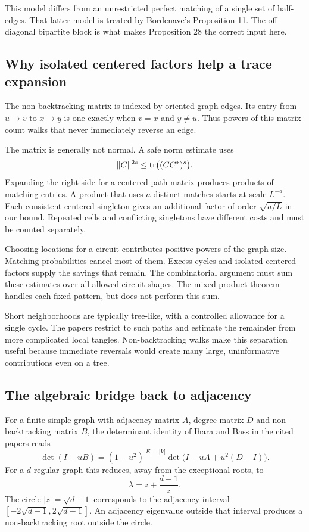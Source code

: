 This model differs from an unrestricted perfect matching of a single set of half-edges. That latter model is treated by Bordenave's Proposition 11. The off-diagonal bipartite block is what makes Proposition 28 the correct input here.

\subsection{Why isolated centered factors help a trace expansion}

The non-backtracking matrix is indexed by oriented graph edges. Its entry from $u\to v$ to $x\to y$ is one exactly when $v=x$ and $y\ne u$. Thus powers of this matrix count walks that never immediately reverse an edge.

The matrix is generally not normal. A safe norm estimate uses
\[
\|C\|^{2s}\le\operatorname{tr}\bigl((CC^*)^s\bigr).
\]
Expanding the right side for a centered path matrix produces products of matching entries. A product that uses $a$ distinct matches starts at scale $L^{-a}$. Each consistent centered singleton gives an additional factor of order $\sqrt{a/L}$ in our bound. Repeated cells and conflicting singletons have different costs and must be counted separately.

Choosing locations for a circuit contributes positive powers of the graph size. Matching probabilities cancel most of them. Excess cycles and isolated centered factors supply the savings that remain. The combinatorial argument must sum these estimates over all allowed circuit shapes. The mixed-product theorem handles each fixed pattern, but does not perform this sum.

Short neighborhoods are typically tree-like, with a controlled allowance for a single cycle. The papers restrict to such paths and estimate the remainder from more complicated local tangles. Non-backtracking walks make this separation useful because immediate reversals would create many large, uninformative contributions even on a tree.

\subsection{The algebraic bridge back to adjacency}

For a finite simple graph with adjacency matrix $A$, degree matrix $D$ and non-backtracking matrix $B$, the determinant identity of Ihara and Bass in the cited papers reads
\begin{equation}\label{eq:ihara}
\det(I-uB)=(1-u^2)^{|E|-|V|}\det\bigl(I-uA+u^2(D-I)\bigr).
\end{equation}
For a $d$-regular graph this reduces, away from the exceptional roots, to
\[
\lambda=z+\frac{d-1}{z}.
\]
The circle $|z|=\sqrt{d-1}$ corresponds to the adjacency interval $[-2\sqrt{d-1},2\sqrt{d-1}]$. An adjacency eigenvalue outside that interval produces a non-backtracking root outside the circle.

